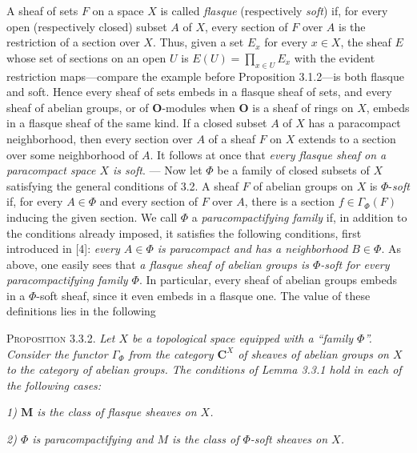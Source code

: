 
A sheaf of sets $F$ on a space $X$ is called \textit{flasque} (respectively
\textit{soft}) if, for every open (respectively closed) subset $A$ of $X$,
every section of $F$ over $A$ is the restriction of a section over $X$. Thus,
given a set $E_x$ for every $x\in X$, the sheaf $E$ whose set of sections on
an open $U$ is
$E(U)=\displaystyle\prod_{x\in U}E_x$
with the evident restriction maps---compare the example before Proposition
3.1.2---is both flasque and soft. Hence every sheaf of sets embeds in a flasque
sheaf of sets, and every sheaf of abelian groups, or of $\mathbf O$-modules
when $\mathbf O$ is a sheaf of rings on $X$, embeds in a flasque sheaf of the
same kind. If a closed subset $A$ of $X$ has a paracompact neighborhood, then
every section over $A$ of a sheaf $F$ on $X$ extends to a section over some
neighborhood of $A$. It follows at once that \textit{every flasque sheaf on a
paracompact space $X$ is soft}. ---
Now let $\Phi$ be a family of closed subsets of $X$ satisfying the general
conditions of 3.2. A sheaf $F$ of abelian groups on $X$ is
$\Phi$-\textit{soft} if, for every $A\in\Phi$ and every section of $F$ over
$A$, there is a section $f\in\Gamma_\Phi(F)$ inducing the given section. We
call $\Phi$ a \textit{paracompactifying family} if, in addition to the
conditions already imposed, it satisfies the following conditions, first
introduced in [4]: \textit{every $A\in\Phi$ is paracompact and has a
neighborhood $B\in\Phi$}. As above, one easily sees that \textit{a flasque
sheaf of abelian groups is $\Phi$-soft for every paracompactifying family
$\Phi$}. In particular, every sheaf of abelian groups embeds in a
$\Phi$-soft sheaf, since it even embeds in a flasque one. The value of these
definitions lies in the following

\indent\textsc{Proposition 3.3.2.} \textit{Let $X$ be a topological space
equipped with a ``family $\Phi$''. Consider the functor $\Gamma_\Phi$ from the
category $\mathbf C^X$ of sheaves of abelian groups on $X$ to the category of abelian
groups. The conditions of Lemma \textup{3.3.1} hold in each of the following cases:}

\indent\textit{\textup{1)} $\mathbf M$ is the class of flasque sheaves on $X$.}

\indent\textit{\textup{2)} $\Phi$ is paracompactifying and $M$ is the class of
$\Phi$-soft sheaves on $X$.}


